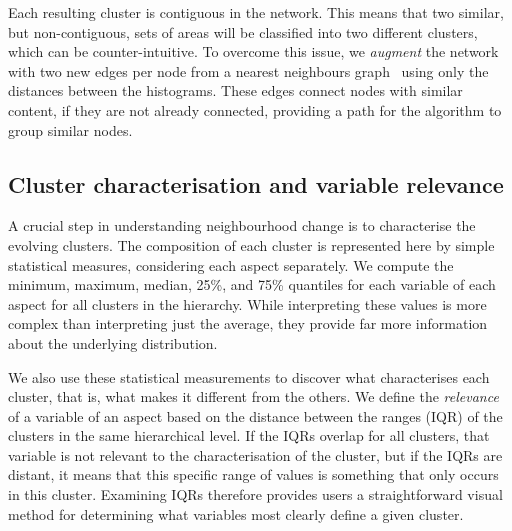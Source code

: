 Each resulting cluster is contiguous in the network. This means that two
similar, but non-contiguous, sets of areas will be classified into two different
clusters, which can be counter-intuitive. To overcome this issue, we
\emph{augment} the network with two new edges per node from a nearest neighbours
graph~\citep{scikit-learn} using only the distances between the histograms.
These edges connect nodes with similar content, if they are not already
connected, providing a path for the algorithm to group similar nodes.


\subsection{Cluster characterisation and variable relevance}
\label{sec:relevance}
A crucial step in understanding neighbourhood change is to characterise the
evolving clusters.  The composition of each cluster is represented here by
simple statistical measures, considering each aspect separately. We compute the
minimum, maximum, median, 25\%, and 75\% quantiles for each variable of each
aspect for all clusters in the hierarchy. While interpreting these values is
more complex than interpreting just the average, they provide far more
information about the underlying distribution.


We also use these statistical measurements to discover what characterises each
cluster, that is, what makes it different from the others.  We define the
\emph{relevance} of a variable of an aspect based on the distance between the
 ranges (IQR) of the clusters in the same hierarchical level. If
the IQRs overlap for all clusters, that variable is not relevant to the
characterisation of the cluster, but if the IQRs are distant, it means that this
specific range of values is something that only occurs in this cluster.
Examining IQRs therefore provides users a straightforward visual method for
determining what variables most clearly define a given cluster.

